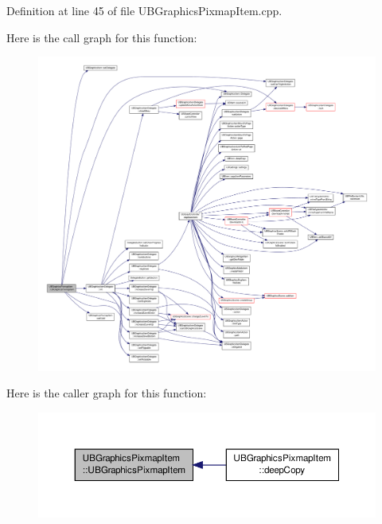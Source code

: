 Definition at line 45 of file U\-B\-Graphics\-Pixmap\-Item.\-cpp.



Here is the call graph for this function\-:
\nopagebreak
\begin{figure}[H]
\begin{center}
\leavevmode
\includegraphics[width=350pt]{d1/d78/class_u_b_graphics_pixmap_item_ad154326709d1935d96248228d21b20ae_cgraph}
\end{center}
\end{figure}




Here is the caller graph for this function\-:
\nopagebreak
\begin{figure}[H]
\begin{center}
\leavevmode
\includegraphics[width=350pt]{d1/d78/class_u_b_graphics_pixmap_item_ad154326709d1935d96248228d21b20ae_icgraph}
\end{center}
\end{figure}


